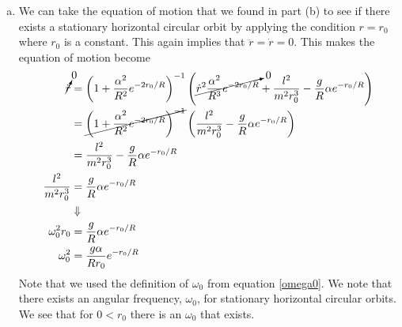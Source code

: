 \documentclass[11pt]{article}
\numberwithin{equation}{section}
\begin{document}
\begin{enumerate}[(a)]
\item We can take the equation of motion that we found in part (b) to see if there exists
a stationary horizontal circular orbit by applying the condition $r=r_0$ where $r_0$ is a
constant. This again implies that $\ddot{r}=\dot{r}=0$. This makes the equation of motion 
become
\begin{align*}
\cancelto{0}{\ddot{r}} &= \left(1 + \frac{\alpha^2}{R^2}e^{-2r_0/R}\right)^{-1}\left(\cancelto{0}{\dot{r}^2\frac{\alpha^2}{R^3}e^{-2r_0/R}} + \frac{l^2}{m^2r_0^3} - \frac{g}{R}\alpha e^{-r_0/R}\right)\\
&= \cancel{\left(1 + \frac{\alpha^2}{R^2}e^{-2r_0/R}\right)^{-1}}\left(\frac{l^2}{m^2r_0^3} - \frac{g}{R}\alpha e^{-r_0/R}\right)\\
&= \frac{l^2}{m^2r_0^3} - \frac{g}{R}\alpha e^{-r_0/R}\\
\frac{l^2}{m^2r_0^3} &= \frac{g}{R}\alpha e^{-r_0/R}\\
&\Downarrow\\
\omega_0^2r_0 &= \frac{g}{R}\alpha e^{-r_0/R}\\
\omega_0^2 &= \frac{g\alpha}{Rr_0}e^{-r_0/R}
\end{align*}
Note that we used the definition of $\omega_0$ from equation \ref{omega0}. We note that there
exists an angular frequency, $\omega_0$, for stationary horizontal circular orbits. We see 
that for $0 < r_0$ there is an $\omega_0$ that exists.  


\end{enumerate}
\end{document}
